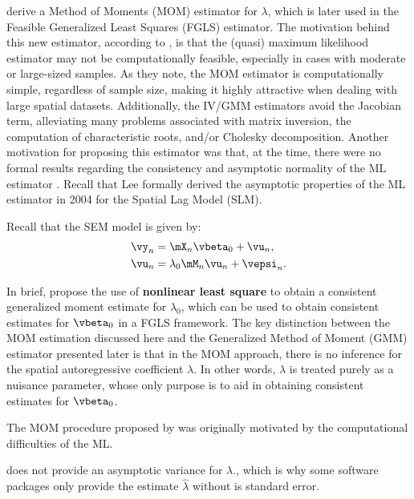 \documentclass[english,12pt]{book}\usepackage[]{graphicx}\usepackage[]{xcolor}
\begin{document}
\cite{kelejian1999generalized} derive a Method of Moments (MOM) estimator for $\lambda$, which is later used in the Feasible Generalized Least Squares (FGLS) estimator. The motivation behind this new estimator, according to \cite{kelejian1999generalized}, is that the (quasi) maximum likelihood estimator may not be computationally feasible, especially in cases with moderate or large-sized samples. As they note, the MOM estimator is computationally simple, regardless of sample size, making it highly attractive when dealing with large spatial datasets. Additionally, the IV/GMM estimators avoid the Jacobian term, alleviating many problems associated with matrix inversion, the computation of characteristic roots, and/or Cholesky decomposition. Another motivation for proposing this estimator was that, at the time, there were no formal results regarding the consistency and asymptotic normality of the ML estimator  \citep[pag. 1608]{pruchaHB}. Recall that Lee formally derived the asymptotic properties of the ML estimator in 2004 for the Spatial Lag Model (SLM).   

Recall that the SEM model is given by: 
\begin{equation}\label{eq:sem_gmm}
	\begin{aligned}
	\vy_n  & = \mX_n\vbeta_0 + \vu_n, \\ 
	\vu_n  & = \lambda_0\mM_n \vu_n + \vepsi_n.
	\end{aligned}
\end{equation}

In brief, \cite{kelejian1999generalized} propose the use of \textbf{nonlinear least square} to obtain a consistent generalized moment estimate for $\lambda_0$, which can be used to obtain consistent estimates for $\vbeta_0$ in a FGLS framework. The key distinction between the MOM estimation discussed here and the Generalized Method of Moment (GMM) estimator presented later is that in the MOM approach, there is no inference for the spatial autoregressive coefficient $\lambda$. In other words, $\lambda$ is treated purely as a nuisance parameter, whose only purpose is to aid in obtaining consistent estimates for $\vbeta_0$.

\begin{remark}
The MOM procedure proposed by \cite{kelejian1999generalized} was originally motivated by the computational difficulties of the ML.
\end{remark}

\begin{remark}
\cite{kelejian1999generalized} does not provide an asymptotic variance for $\lambda$., which is why some software packages only provide the estimate $\widehat{\lambda}$ without is standard error. 
\end{remark}
\end{document}
